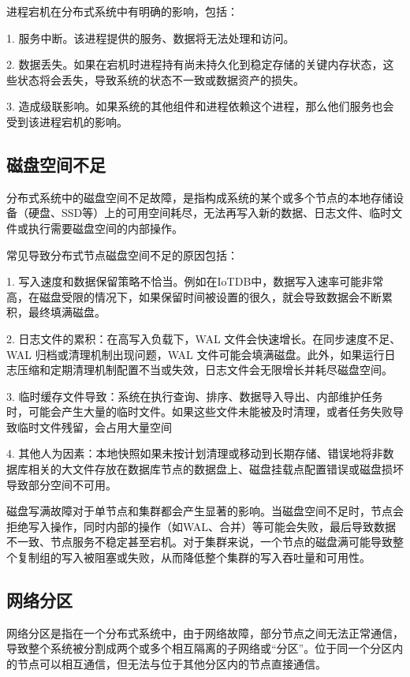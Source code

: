 进程宕机在分布式系统中有明确的影响，包括：

1. 服务中断。该进程提供的服务、数据将无法处理和访问。

2. 数据丢失。如果在宕机时进程持有尚未持久化到稳定存储的关键内存状态，这些状态将会丢失，导致系统的状态不一致或数据资产的损失。

3. 造成级联影响。如果系统的其他组件和进程依赖这个进程，那么他们服务也会受到该进程宕机的影响。

\subsection{磁盘空间不足}

分布式系统中的磁盘空间不足故障，是指构成系统的某个或多个节点的本地存储设备（硬盘、SSD等）上的可用空间耗尽，无法再写入新的数据、日志文件、临时文件或执行需要磁盘空间的内部操作。

常见导致分布式节点磁盘空间不足的原因包括：

1. 写入速度和数据保留策略不恰当。例如在IoTDB中，数据写入速率可能非常高，在磁盘受限的情况下，如果保留时间被设置的很久，就会导致数据会不断累积，最终填满磁盘。

2. 日志文件的累积：在高写入负载下，WAL 文件会快速增长。在同步速度不足、WAL 归档或清理机制出现问题，WAL 文件可能会填满磁盘。此外，如果运行日志压缩和定期清理机制配置不当或失效，日志文件会无限增长并耗尽磁盘空间。

3. 临时缓存文件导致：系统在执行查询、排序、数据导入导出、内部维护任务时，可能会产生大量的临时文件。如果这些文件未能被及时清理，或者任务失败导致临时文件残留，会占用大量空间

4. 其他人为因素：本地快照如果未按计划清理或移动到长期存储、错误地将非数据库相关的大文件存放在数据库节点的数据盘上、磁盘挂载点配置错误或磁盘损坏导致部分空间不可用。

磁盘写满故障对于单节点和集群都会产生显著的影响。当磁盘空间不足时，节点会拒绝写入操作，同时内部的操作（如WAL、合并）等可能会失败，最后导致数据不一致、节点服务不稳定甚至宕机。对于集群来说，一个节点的磁盘满可能导致整个复制组的写入被阻塞或失败，从而降低整个集群的写入吞吐量和可用性。

\subsection{网络分区}

网络分区是指在一个分布式系统中，由于网络故障，部分节点之间无法正常通信，导致整个系统被分割成两个或多个相互隔离的子网络或“分区”。位于同一个分区内的节点可以相互通信，但无法与位于其他分区内的节点直接通信。

